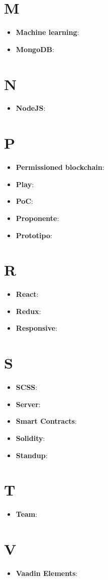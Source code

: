 \documentclass[a4paper, oneside, openany]{article}
\begin{document}
\section{M}
\begin{itemize}
\item \textbf{Machine learning}:
\item \textbf{MongoDB}:
\end{itemize}

\section{N}
\begin{itemize}
\item \textbf{NodeJS}:
\end{itemize}

\section{P}
\begin{itemize}
\item \textbf{Permissioned blockchain}:
\item \textbf{Play}:
\item \textbf{PoC}:
\item \textbf{Proponente}:
\item \textbf{Prototipo}:
\end{itemize}

\section{R}
\begin{itemize}
\item \textbf{React}:
\item \textbf{Redux}:
\item \textbf{Responsive}:
\end{itemize}

\section{S}
\begin{itemize}
\item \textbf{SCSS}:
\item \textbf{Server}:
\item \textbf{Smart Contracts}:
\item \textbf{Solidity}:
\item \textbf{Standup}:
\end{itemize}

\section{T}
\begin{itemize}
\item \textbf{Team}:
\end{itemize}

\section{V}
\begin{itemize}
\item \textbf{Vaadin Elements}:
\end{itemize}
\end{document}

